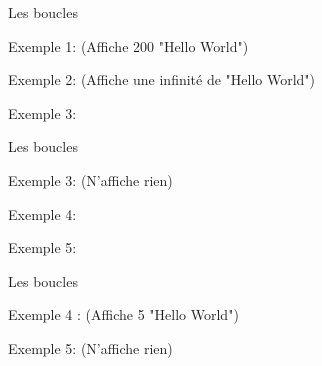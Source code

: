 \documentclass{beamer}
\begin{document}
\begin{darkframes}


	
	\begin{frame}{Les boucles}
		\begin{center}
			\begin{minipage}[t]{0.8\linewidth}
				Exemple 1: (\alert{Affiche 200 "Hello World"})
				\forExmpOne
			\end{minipage}
			\begin{minipage}[t]{0.8\linewidth}
				Exemple 2: (\alert{Affiche une infinité de "Hello World"})
				\forExmpTwo
			\end{minipage}
			\begin{minipage}[t]{0.8\linewidth}
				Exemple 3:
				\forExmpThree
			\end{minipage}
		\end{center}
	\end{frame}
	
	\begin{frame}{Les boucles}	
		\begin{minipage}[t]{0.8\linewidth}
			Exemple 3: (\alert{N'affiche rien})
			\forExmpThree
		\end{minipage}
		\begin{minipage}[t]{0.8\linewidth}
			Exemple 4:
			\forExmpFour
		\end{minipage}
		\begin{minipage}[t]{0.8\linewidth}
			Exemple 5:
			\forExmpFive
		\end{minipage}
	\end{frame}

	\begin{frame}{Les boucles}
		\begin{minipage}[t]{0.8\linewidth}
			Exemple 4 :  (\alert{Affiche 5 "Hello World"})
			\forExmpFour
		\end{minipage}
		\begin{minipage}[t]{0.8\linewidth}
			Exemple 5: (\alert{N'affiche rien})
			\forExmpFive
		\end{minipage}
	\end{frame}


\end{darkframes}
\end{document}
